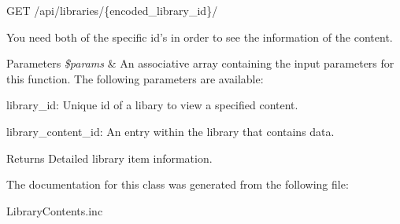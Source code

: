 G\-E\-T /api/libraries/\{encoded\-\_\-library\-\_\-id\}/

You need both of the specific id's in order to see the information of the content.


\begin{DoxyParams}{Parameters}
{\em \$params} & An associative array containing the input parameters for this function. The following parameters are available\-:\\
\hline
\end{DoxyParams}

\begin{DoxyItemize}
\item library\-\_\-id\-: Unique id of a libary to view a specified content.
\item library\-\_\-content\-\_\-id\-: An entry within the library that contains data.
\end{DoxyItemize}

\begin{DoxyReturn}{Returns}
Detailed library item information. 
\end{DoxyReturn}


The documentation for this class was generated from the following file\-:\begin{DoxyCompactItemize}
\item 
Library\-Contents.\-inc\end{DoxyCompactItemize}
